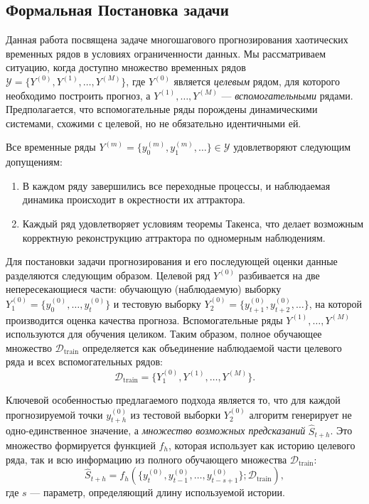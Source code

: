 \documentclass[a4paper,12pt]{extarticle}
\begin{document}
\subsection{Формальная Постановка задачи}

Данная работа посвящена задаче многошагового прогнозирования хаотических
 временных рядов в условиях ограниченности данных. Мы рассматриваем ситуацию,
  когда доступно множество временных рядов $\mathcal{Y} = \{Y^{(0)}, Y^{(1)},
   \dots, Y^{(M)}\}$, где $Y^{(0)}$ является \textit{целевым} рядом, для которого
    необходимо построить прогноз, а $Y^{(1)}, \dots, Y^{(M)}$ — \textit{вспомогательными} рядами.
     Предполагается, что вспомогательные ряды порождены динамическими системами,
      схожими с целевой, но не обязательно идентичными ей.

Все временные ряды $Y^{(m)} = \{y_0^{(m)}, y_1^{(m)}, \dots\} \in \mathcal{Y}$ удовлетворяют следующим допущениям:
\begin{enumerate}
    \item В каждом ряду завершились все переходные процессы, и наблюдаемая
    динамика происходит в окрестности их аттрактора.
    \item Каждый ряд удовлетворяет условиям теоремы Такенса\cite{Takens1981}, что делает
    возможным корректную реконструкцию аттрактора по одномерным наблюдениям.
\end{enumerate}

Для постановки задачи прогнозирования и его последующей оценки данные разделяются
 следующим образом. Целевой ряд $Y^{(0)}$ разбивается на две непересекающиеся части:
  обучающую (наблюдаемую) выборку $Y_1^{(0)} = \{y_0^{(0)}, \dots, y_t^{(0)}\}$ и
   тестовую выборку $Y_2^{(0)} = \{y_{t+1}^{(0)}, y_{t+2}^{(0)}, \dots\}$, на которой
    производится оценка качества прогноза. Вспомогательные ряды $Y^{(1)}, \dots, Y^{(M)}$
     используются для обучения целиком. Таким образом, полное обучающее множество
     $\mathcal{D}_{\text{train}}$ определяется как объединение наблюдаемой части
      целевого ряда и всех вспомогательных рядов:
\[
\mathcal{D}_{\text{train}} = \{Y_1^{(0)}, Y^{(1)}, \dots, Y^{(M)}\}.
\]

Ключевой особенностью предлагаемого подхода является то, что для каждой
 прогнозируемой точки $y_{t+h}^{(0)}$ из тестовой выборки $Y_2^{(0)}$ алгоритм
  генерирует не одно-единственное значение, а \textit{множество возможных предсказаний}
   $\hat{S}_{t+h}$. Это множество формируется функцией $f_h$, которая использует
   как историю целевого ряда, так и всю информацию из полного обучающего множества $\mathcal{D}_{\text{train}}$:
\[
\hat{S}_{t+h} = f_h\left(\{y_t^{(0)}, y_{t-1}^{(0)}, \dots, y_{t-s+1}^{(0)}\}; \mathcal{D}_{\text{train}}\right),
\]
где $s$ — параметр, определяющий длину используемой истории.
\end{document}
